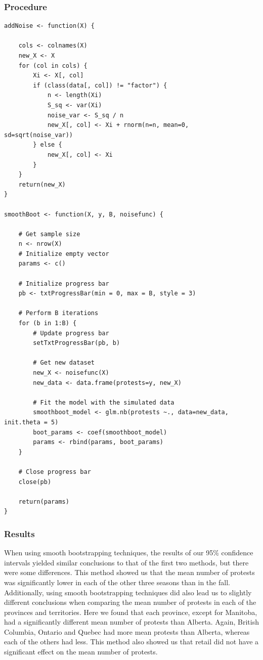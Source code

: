\documentclass[12pt]{article}
\begin{document}
\subsubsection*{Procedure}
\begin{lstlisting}
addNoise <- function(X) {

    cols <- colnames(X)
    new_X <- X
    for (col in cols) {
        Xi <- X[, col]
        if (class(data[, col]) != "factor") {
            n <- length(Xi)
            S_sq <- var(Xi)
            noise_var <- S_sq / n
            new_X[, col] <- Xi + rnorm(n=n, mean=0, sd=sqrt(noise_var))
        } else {
            new_X[, col] <- Xi
        }
    }
    return(new_X)
}

smoothBoot <- function(X, y, B, noisefunc) {

    # Get sample size
    n <- nrow(X)
    # Initialize empty vector
    params <- c()
    
    # Initialize progress bar
    pb <- txtProgressBar(min = 0, max = B, style = 3)
    
    # Perform B iterations
    for (b in 1:B) {
        # Update progress bar
        setTxtProgressBar(pb, b)
        
        # Get new dataset
        new_X <- noisefunc(X)
        new_data <- data.frame(protests=y, new_X)
        
        # Fit the model with the simulated data
        smoothboot_model <- glm.nb(protests ~., data=new_data, init.theta = 5)
        boot_params <- coef(smoothboot_model)
        params <- rbind(params, boot_params)
    }
    
    # Close progress bar
    close(pb)
    
    return(params)
}
\end{lstlisting}
\subsubsection*{Results}
When using smooth bootstrapping techniques, the results of our 95\% confidence intervals yielded similar conclusions to that of the first two methods, but there were some differences. This method showed us that the mean number of protests was significantly lower in each of the other three seasons than in the fall.
Additionally, using smooth bootstrapping techniques did also lead us to slightly different conclusions when comparing the mean number of protests in each of the provinces and territories. Here we found that each province, except for Manitoba, had a significantly different mean number of protests than Alberta. Again, British Columbia, Ontario and Quebec had more mean protests than Alberta, whereas each of the others had less.
This method also showed us that retail did not have a significant effect on the mean number of protests.
\end{document}
